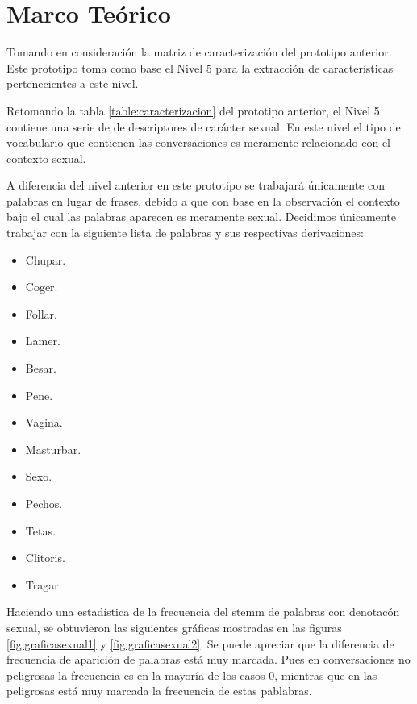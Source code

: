 \section{Marco Te\'orico}
Tomando en consideraci\'on la matriz de caracterizaci\'on del prototipo anterior. Este prototipo toma como base el Nivel 5 para la extracci\'on de caracter\'isticas pertenecientes a este nivel.

Retomando la tabla \ref{table:caracterizacion} del prototipo anterior, el Nivel 5 contiene una serie de de descriptores de car\'acter sexual. En este nivel el tipo de vocabulario que contienen las conversaciones es meramente relacionado con el contexto sexual.

A diferencia del nivel anterior en este prototipo se trabajar\'a \'unicamente con palabras en lugar de frases, debido a que con base en la observaci\'on el contexto bajo el cual las palabras aparecen es meramente sexual. Decidimos \'unicamente trabajar con la siguiente lista de palabras y sus respectivas derivaciones:

\begin{itemize}
\item Chupar. 
\item Coger. 
\item Follar. 
\item Lamer. 
\item Besar. 
\item Pene. 
\item Vagina. 
\item Masturbar. 
\item Sexo. 
\item Pechos. 
\item Tetas.
\item Clitoris.
\item Tragar.
\end{itemize}


Haciendo una estad\'istica de la frecuencia del stemm de palabras con denotac\'on sexual, se obtuvieron las siguientes gr\'aficas mostradas en las figuras \ref{fig:graficasexual1} y \ref{fig:graficasexual2}. Se puede apreciar que la diferencia de frecuencia de aparici\'on de palabras est\'a muy marcada. Pues en conversaciones no peligrosas la frecuencia es en la mayor\'ia de los casos 0, mientras que en las peligrosas est\'a muy marcada la frecuencia de estas pablabras.

